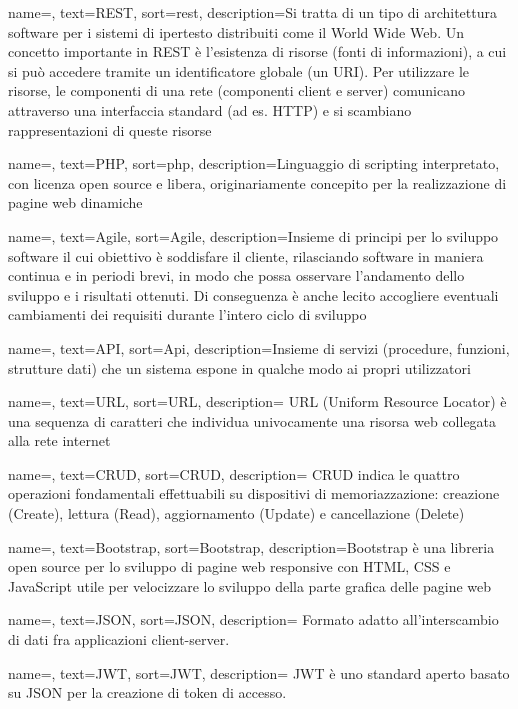 {
	name=,
	text=REST,
	sort=rest,
	description={Si tratta di un tipo di architettura software per i sistemi di ipertesto distribuiti come il World Wide Web. Un concetto importante in REST è l’esistenza di risorse (fonti di informazioni), a cui si può accedere tramite un identificatore globale (un URI). Per utilizzare le risorse, le componenti di una rete (componenti client e server) comunicano attraverso una interfaccia standard (ad es. HTTP) e si scambiano rappresentazioni di queste risorse}
}

{
	name=,
	text=PHP,
	sort=php,
	description={Linguaggio di scripting interpretato, con licenza open source e libera, originariamente concepito per la realizzazione di pagine web dinamiche}
}

{
	name=,
	text=Agile,
	sort=Agile,
	description={Insieme di principi per lo sviluppo software il cui obiettivo è soddisfare il cliente, rilasciando software in
		maniera continua e in periodi brevi, in modo che possa osservare l’andamento dello
		sviluppo e i risultati ottenuti. Di conseguenza è anche lecito accogliere eventuali
		cambiamenti dei requisiti durante l’intero ciclo di sviluppo
	}
}

{
	name=,
	text=API,
	sort=Api,
	description={Insieme di servizi (procedure, funzioni, strutture dati) che un sistema espone in qualche modo ai propri utilizzatori}
}

 {
	name=,
	text=URL,
	sort=URL,
	description={
		URL (Uniform Resource Locator) è una sequenza di caratteri che individua univocamente una risorsa web 
		collegata alla rete internet
	}
}

 {
	name=,
	text=CRUD,
	sort=CRUD,
	description={
		CRUD indica le quattro operazioni fondamentali effettuabili su
		dispositivi di memoriazzazione: creazione (Create), lettura (Read), aggiornamento (Update) e cancellazione (Delete)
	}
}

 {
	name=,
	text=Bootstrap,
	sort=Bootstrap,
	description={Bootstrap è una libreria open source per lo sviluppo di pagine web responsive con HTML, CSS e JavaScript
		utile per velocizzare lo sviluppo della parte grafica delle pagine web
	}
}

 {
	name=,
	text=JSON,
	sort=JSON,
	description={
		 Formato adatto all’interscambio di dati fra applicazioni client-server.
	}
}

 {
	name=,
	text=JWT,
	sort=JWT,
	description={
		JWT è uno standard aperto basato su JSON per la creazione di token di accesso.
	}
}
